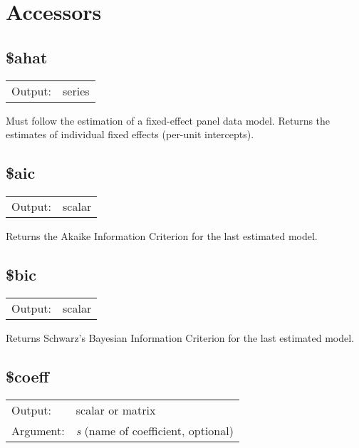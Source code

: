 \section{Accessors}
\label{sec:accessors}

\subsection{\$ahat}
\hypertarget{func-dolahat}{}

\begin{tabular}{ll}
Output:     & series\\
\end{tabular}

	  Must follow the estimation of a fixed-effect panel data model.
	  Returns the estimates of individual fixed effects (per-unit
	  intercepts).

\subsection{\$aic}
\hypertarget{func-dolaic}{}

\begin{tabular}{ll}
Output:     & scalar\\
\end{tabular}

	  Returns the Akaike Information Criterion for the last estimated
	  model. 

\subsection{\$bic}
\hypertarget{func-dolbic}{}

\begin{tabular}{ll}
Output:     & scalar\\
\end{tabular}

	  Returns Schwarz's Bayesian Information Criterion for the last
	  estimated model.

\subsection{\$coeff}
\hypertarget{func-dolcoeff}{}

\begin{tabular}{ll}
Output:     & scalar or matrix\\
Argument:   & \textsl{s} (name of coefficient, optional)\\
\end{tabular}

